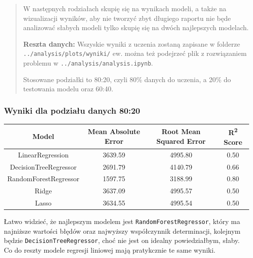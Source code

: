 \documentclass[a4paper]{article}
\begin{document}
\begin{abstract}
    \quad W następnych rodziałach skupię się na wynikach modeli, a także na wizualizacji wyników, aby nie
    tworzyć zbyt długiego raportu nie będe analizować słabych modeli tylko skupię się na dwóch najlepszych modelach.

    \textbf{Reszta danych: } Wszyskie wyniki z uczenia zostaną zapisane w folderze \texttt{../analysis/plots/wyniki/} ew. można też
    podejrzeć plik z rozwiązaniem problemu w \texttt{../analysis/analysis.ipynb}.

    \quad Stosowane podziałki to 80:20, czyli 80\% danych do uczenia, a 20\% do testowania modelu oraz 60:40.
\end{abstract}

\subsubsection{Wyniki dla podziału danych 80:20}

\begin{table}[H]
    \centering
    \begin{tabular}{|c|c|c|c|}
        \hline
        \textbf{Model}        & \textbf{Mean Absolute Error} & \textbf{Root Mean Squared Error} & \textbf{R\textsuperscript{2} Score} \\ \hline
        LinearRegression      & 3639.59                      & 4995.80                          & 0.50                                \\ \hline
        DecisionTreeRegressor & 2691.79                      & 4140.79                          & 0.66                                \\ \hline
        RandomForestRegressor & 1597.75                      & 3188.99                          & 0.80                                \\ \hline
        Ridge                 & 3637.09                      & 4995.57                          & 0.50                                \\ \hline
        Lasso                 & 3634.55                      & 4995.54                          & 0.50                                \\ \hline
    \end{tabular}
\end{table}


\quad Łatwo widzieć, że najlepszym modelem jest \texttt{RandomForestRegressor}, który ma
najniższe wartości błędów oraz najwyższy współczynnik determinacji, kolejnym
będzie \texttt{DecisionTreeRegressor}, choć nie jest on idealny powiedziałbym, słaby.
Co do reszty modele regresji liniowej mają pratykcznie te same wyniki.
\end{document}
